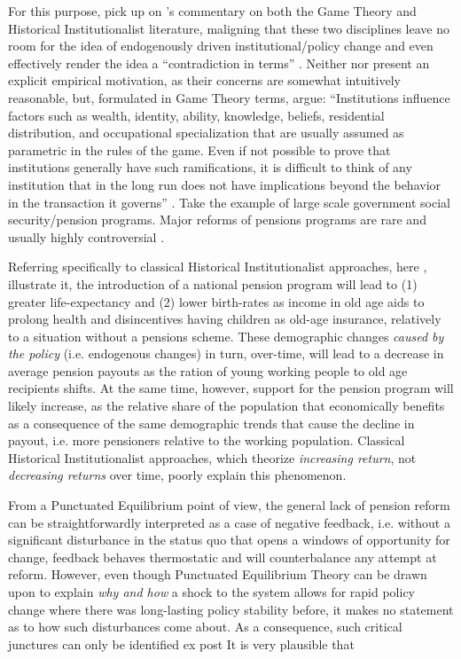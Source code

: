 \documentclass[11pt]{article}
\begin{document}
For this purpose, \textcite[][]{Jacobs2014} pick up on \citeauthor{Greif2004}'s \parencite*{Greif2004} commentary on both the Game Theory and Historical Institutionalist literature, maligning that these two disciplines leave no room for the idea of endogenously driven institutional/policy change and even effectively render the idea a \enquote{contradiction in terms} \parencite[][p. 633]{Greif2004}. Neither \textcite[][]{Jacobs2014} nor \textcite[][]{Greif2004} present an explicit empirical motivation, as their concerns are somewhat intuitively reasonable, but, formulated in Game Theory terms, \textcite[][]{Greif2004} argue: \enquote{Institutions influence factors such as wealth, identity, ability, knowledge, beliefs, residential distribution, and occupational specialization that are usually assumed as parametric in the rules of the game. Even if not possible to prove that institutions generally have such ramifications, it is difficult to think of any institution that in the long run does not have implications beyond the behavior in the transaction it governs} \textcite[][p. 636]{Greif2004}. Take the example of large scale government social security/pension programs. Major reforms of pensions programs are rare and usually highly controversial  \parencite[see e.g. recent attempts in France to raise the retirement age][]{Leali2023}. 

Referring specifically to classical Historical Institutionalist approaches, here \textcite[][]{Pierson2000}, \textcite{Greif2004} illustrate it, the introduction of a national pension program will lead to (1) greater life-expectancy and (2) lower birth-rates as income in old age aids to prolong health and disincentives having children as old-age insurance, relatively to a situation without a pensions scheme. These demographic changes \textit{caused by the policy} (i.e. endogenous changes) in turn, over-time, will lead to a decrease in average pension payouts as the ration of young working people to old age recipients shifts. At the same time, however, support for the pension program will likely increase, as the relative share of the population that economically benefits as a consequence of the same demographic trends that cause the decline in payout, i.e. more pensioners relative to the working population. Classical Historical Institutionalist approaches, which theorize \textit{increasing return}, not \textit{decreasing returns} over time, poorly explain this phenomenon.

From a Punctuated Equilibrium point of view, the general lack of pension reform can be straightforwardly interpreted as a case of negative feedback, i.e. without a significant disturbance in the status quo that opens a windows of opportunity for change, feedback behaves thermostatic and will counterbalance any attempt at reform. However, even though Punctuated Equilibrium Theory can be drawn upon to explain \textit{why and how} a shock to the system allows for rapid policy change where there was long-lasting policy stability before, it makes no statement as to how such disturbances come about. As a consequence, such critical junctures can only be identified ex post It is very plausible that
\end{document}

